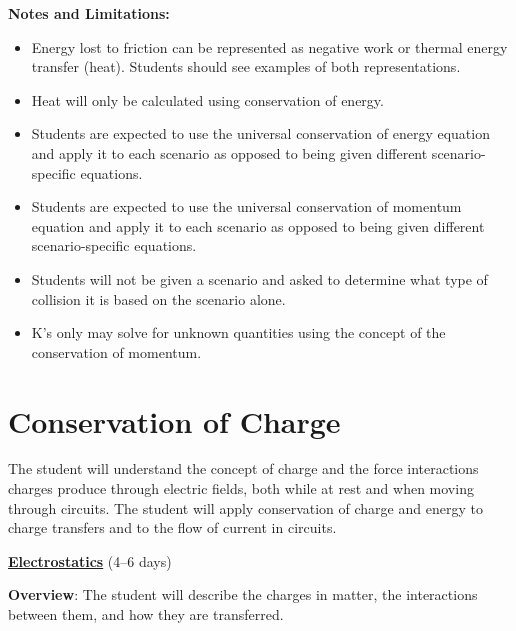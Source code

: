 \documentclass[dvipsnames]{article}
\begin{document}
\textbf{Notes and Limitations:}
\begin{itemize}[topsep=-3pt,itemsep=0pt]
    \item Energy lost to friction can be represented as negative work or  thermal energy transfer (heat). Students should see examples of both representations.
    \item Heat will only be calculated using conservation of energy. 
    \item Students are expected to use the universal conservation of energy equation and apply it to each scenario as opposed to being given different scenario-specific equations.
    \item Students are expected to use the universal conservation of momentum equation and apply it to each scenario as opposed to being given different scenario-specific equations.
    \item Students will not be given a scenario and asked to determine what type of collision it is based on the scenario alone. 
    \item K's only may solve for unknown quantities using the concept of the conservation of momentum.
\end{itemize}


\clearpage
\section{Conservation of Charge}

\vspace{-3pt}
The student will understand the concept of charge and the force interactions charges produce through electric fields, both while at rest and when moving through circuits. The student will apply conservation of charge and energy to charge transfers and to the flow of current in circuits.
\vspace{3pt}

\textbf{\underline{Electrostatics}} (4--6 days)

\textbf{Overview}: The student will describe the charges in matter, the interactions between them, and how they are transferred.
\end{document}
